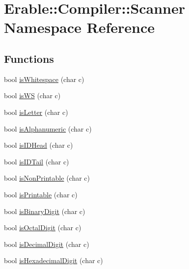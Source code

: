 \hypertarget{namespace_erable_1_1_compiler_1_1_scanner}{}\section{Erable\+::Compiler\+::Scanner Namespace Reference}
\label{namespace_erable_1_1_compiler_1_1_scanner}
\subsection*{Functions}
\begin{DoxyCompactItemize}
\item 
bool \mbox{\hyperlink{namespace_erable_1_1_compiler_1_1_scanner_affbf87ea30041623c5c2ce87d92f49f4}{is\+Whitespace}} (char c)
\item 
bool \mbox{\hyperlink{namespace_erable_1_1_compiler_1_1_scanner_adc0ac6c30089d727ab5356a49d0a523d}{is\+WS}} (char c)
\item 
bool \mbox{\hyperlink{namespace_erable_1_1_compiler_1_1_scanner_afc56c3f79f43667e1bd2ac272a2a7e45}{is\+Letter}} (char c)
\item 
bool \mbox{\hyperlink{namespace_erable_1_1_compiler_1_1_scanner_afc801f00de7d279a3ce4d8e1c13bca57}{is\+Alphanumeric}} (char c)
\item 
bool \mbox{\hyperlink{namespace_erable_1_1_compiler_1_1_scanner_a9ac07c9b31faf11d868f24df23374092}{is\+I\+D\+Head}} (char c)
\item 
bool \mbox{\hyperlink{namespace_erable_1_1_compiler_1_1_scanner_a729dfc1206c966c0e2dc4010e824c007}{is\+I\+D\+Tail}} (char c)
\item 
bool \mbox{\hyperlink{namespace_erable_1_1_compiler_1_1_scanner_ac906f83a93283a8b3145155e74b4724e}{is\+Non\+Printable}} (char c)
\item 
bool \mbox{\hyperlink{namespace_erable_1_1_compiler_1_1_scanner_ab62dc9f62ccca46e26db602a16c1f1dc}{is\+Printable}} (char c)
\item 
bool \mbox{\hyperlink{namespace_erable_1_1_compiler_1_1_scanner_a63bbec9bff5a9a75990b07e86e1e6033}{is\+Binary\+Digit}} (char c)
\item 
bool \mbox{\hyperlink{namespace_erable_1_1_compiler_1_1_scanner_afebf3a466b8a23efc7dd384d63d45db7}{is\+Octal\+Digit}} (char c)
\item 
bool \mbox{\hyperlink{namespace_erable_1_1_compiler_1_1_scanner_a431b536f7bd933c75a6347ee71dcc4bd}{is\+Decimal\+Digit}} (char c)
\item 
bool \mbox{\hyperlink{namespace_erable_1_1_compiler_1_1_scanner_aa4b15730c2948a71b982670662e798ee}{is\+Hexadecimal\+Digit}} (char c)

\end{DoxyCompactItemize}
